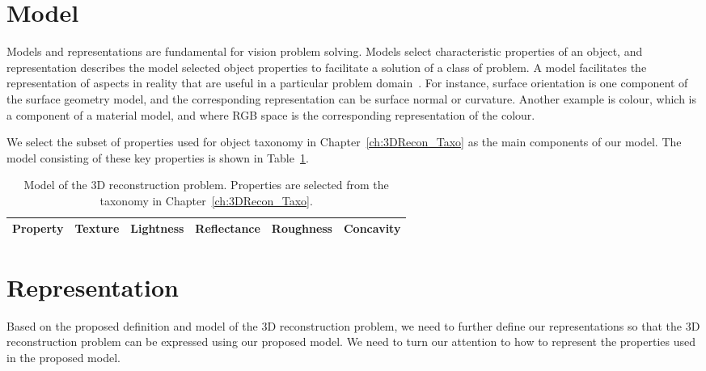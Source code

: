 \section{Model}
\label{sec:3DRecon_Model}
Models and representations are fundamental for vision problem solving. Models select characteristic properties of an object, and representation describes the model selected object properties to facilitate a solution of a class of problem. A model facilitates the representation of aspects in reality that are useful in a particular problem domain~\cite{bolles19863dpo}. For instance, surface orientation is one component of the surface geometry model, and the corresponding representation can be surface normal or curvature. Another example is colour, which is a component of a material model, and where RGB space is the corresponding representation of the colour.

We select the subset of properties used for object taxonomy in Chapter~\ref{ch:3DRecon_Taxo} as the main components of our model. The model consisting of these key properties is shown in Table~\ref{tab:3DRecon_model}.
\begin{table}[h]
  \centering
  \begin{tabular}{l|*{5}{c}}
  \hline
  \textbf{Property} & Texture & Lightness & Reflectance & Roughness & Concavity\\
  \hline
  \end{tabular}
  \caption{Model of the 3D reconstruction problem. Properties are selected from the taxonomy in Chapter~\ref{ch:3DRecon_Taxo}.}
  \label{tab:3DRecon_model}
\end{table}



\section{Representation}
\label{sec:3DRecon_Rep}
Based on the proposed definition and model of the 3D reconstruction problem, we need to further define our representations so that the 3D reconstruction problem can be expressed using our proposed model. We need to turn our attention to how to represent the properties used in the proposed model.

